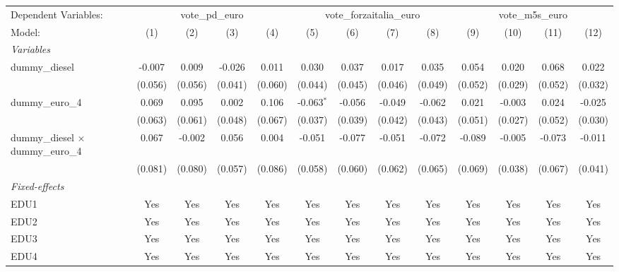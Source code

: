 
\begingroup
\centering
\begin{tabular}{lcccccccccccc}
   \tabularnewline \midrule \midrule
   Dependent Variables: & \multicolumn{4}{c}{vote\_pd\_euro} & \multicolumn{4}{c}{vote\_forzaitalia\_euro} & \multicolumn{4}{c}{vote\_m5s\_euro}\\
   Model:                                    & (1)     & (2)     & (3)     & (4)     & (5)          & (6)     & (7)     & (8)     & (9)     & (10)    & (11)    & (12)\\  
   \midrule
   \emph{Variables}\\
   dummy\_diesel                             & -0.007  & 0.009   & -0.026  & 0.011   & 0.030        & 0.037   & 0.017   & 0.035   & 0.054   & 0.020   & 0.068   & 0.022\\   
                                             & (0.056) & (0.056) & (0.041) & (0.060) & (0.044)      & (0.045) & (0.046) & (0.049) & (0.052) & (0.029) & (0.052) & (0.032)\\   
   dummy\_euro\_4                            & 0.069   & 0.095   & 0.002   & 0.106   & -0.063$^{*}$ & -0.056  & -0.049  & -0.062  & 0.021   & -0.003  & 0.024   & -0.025\\   
                                             & (0.063) & (0.061) & (0.048) & (0.067) & (0.037)      & (0.039) & (0.042) & (0.043) & (0.051) & (0.027) & (0.052) & (0.030)\\   
   dummy\_diesel $\times$ dummy\_euro\_4     & 0.067   & -0.002  & 0.056   & 0.004   & -0.051       & -0.077  & -0.051  & -0.072  & -0.089  & -0.005  & -0.073  & -0.011\\   
                                             & (0.081) & (0.080) & (0.057) & (0.086) & (0.058)      & (0.060) & (0.062) & (0.065) & (0.069) & (0.038) & (0.067) & (0.041)\\   
   \midrule
   \emph{Fixed-effects}\\
   EDU1                                      & Yes     & Yes     & Yes     & Yes     & Yes          & Yes     & Yes     & Yes     & Yes     & Yes     & Yes     & Yes\\  
   EDU2                                      & Yes     & Yes     & Yes     & Yes     & Yes          & Yes     & Yes     & Yes     & Yes     & Yes     & Yes     & Yes\\  
   EDU3                                      & Yes     & Yes     & Yes     & Yes     & Yes          & Yes     & Yes     & Yes     & Yes     & Yes     & Yes     & Yes\\  
   EDU4                                      & Yes     & Yes     & Yes     & Yes     & Yes          & Yes     & Yes     & Yes     & Yes     & Yes     & Yes     & Yes\\  

\end{tabular}

